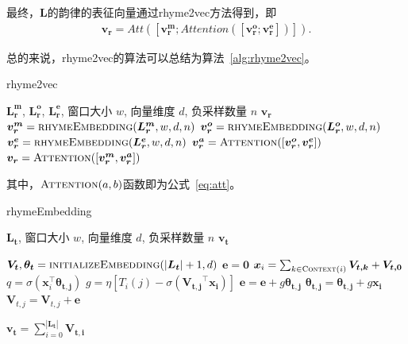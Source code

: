 最终，$\bm {L}$的韵律的表征向量通过rhyme2vec方法得到，即
\begin{equation}
  \begin{gathered}
  \label{eq:vr}
  \bm{v_r}=Att([\bm {v_r^m}; Attention([\bm{v_r^o}; \bm{v_r^e}])]).
  \end{gathered}
\end{equation}
\par

总的来说，rhyme2vec的算法可以总结为算法~\ref{alg:rhyme2vec}。\par
\begin{algorithm}  
        \caption{rhyme2vec} 
        \label{alg:rhyme2vec} 
        \begin{algorithmic}[1] 
            \Require $\bm {L_r^m}$, $\bm {L_r^o}$, $\bm {L_r^e}$, 窗口大小 $w$, 向量维度 $d$, 负采样数量 $n$
            \Ensure $\bm {v_r}$
                \State $\bm {v_r^m} = \Call{rhymeEmbedding}{\bm {L_r^m}, w, d, n}$ 
                \State $\bm {v_r^o} = \Call{rhymeEmbedding}{\bm {L_r^o}, w, d, n}$ 
                \State $\bm {v_r^e} = \Call{rhymeEmbedding}{\bm {L_r^e}, w, d, n}$ 
                \State $\bm {v_r^a} = \Call{Attention}{{[\bm {v_r^o}, \bm {v_r^e}]}}$ 
                \State $\bm {v_r} = \Call{Attention}{{[\bm {v_r^m}, \bm {v_r^a}]}}$ 
                \State {}  
        \end{algorithmic}  
\end{algorithm}  
其中，$\Call{Attention}{a, b}$函数即为公式~\ref{eq:att}。

\begin{algorithm}  
        \caption{rhymeEmbedding} 
        \label{alg:rhymeembedding} 
        \begin{algorithmic}[1]  
        \Require $\bm {L_t}$, 窗口大小 $w$, 向量维度 $d$, 负采样数量 $n$
            \Ensure $\bm {v_t}$
            
              \State $\bm {V_t}, \bm {\theta_t} = \Call{initializeEmbedding}{|\bm {L_t}| + 1, d}$
                      \State $\bm e = \bm 0$
                      \State $\bm x_i = \sum_{k\in \Call{Context}{i}} \bm {V_{t, k}} + \bm {V_{t, 0}}$
                          \State $q = \sigma(\bm x_i^\top \bm {\theta_{t, j}})$
                          \State $g = \eta{[T_i(j)-\sigma(\bm {V_{t, j}}^\top \bm {x_i})]}$
                          \State $\bm e = \bm e + g\bm {\theta_{t, j}}$
                          \State $\bm {\theta_{t, j}} = \bm {\theta_{t, j}} + g\bm {x_i}$
                      \EndFor
                          \State $\bm V_{t, j} = \bm V_{t, j} + \bm e$
                      \EndFor

                  \EndFor
                \EndFor
                \State $\bm {v_t} = \sum_{i = 0}^{|\bm {L_t}|}\bm{V_{t, i}}$
                \State {} 
        \end{algorithmic}  
    \end{algorithm}  

